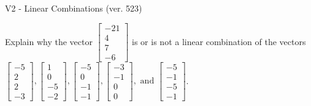 \begin{exercise}
  \begin{exerciseTitle}V2 - Linear Combinations (ver. 523)\end{exerciseTitle}
  \begin{exerciseStatement}
    Explain why the vector \(\left[\begin{array}{c}
-21 \\
4 \\
7 \\
-6
\end{array}\right]\)  is or is not a linear 
	combination of the vectors \(\left[\begin{array}{c}
-5 \\
2 \\
2 \\
-3
\end{array}\right] , \left[\begin{array}{c}
1 \\
0 \\
-5 \\
-2
\end{array}\right] , \left[\begin{array}{c}
-5 \\
0 \\
-1 \\
-1
\end{array}\right] , \left[\begin{array}{c}
-3 \\
-1 \\
0 \\
0
\end{array}\right] , \text{ and } \left[\begin{array}{c}
-5 \\
-1 \\
-5 \\
-1
\end{array}\right]\).
	



\end{exerciseStatement}
\end{exercise}
